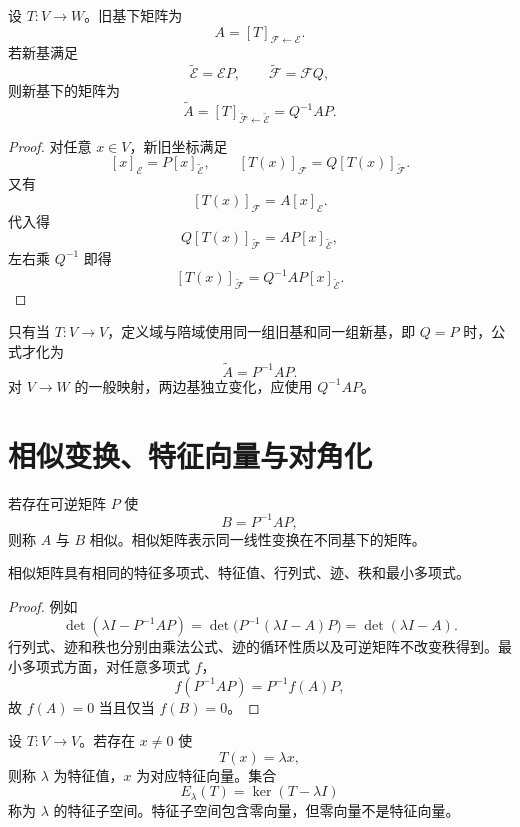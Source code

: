\begin{theorem}[一般线性映射的换基公式]
设 $T:V\to W$。旧基下矩阵为
\[
A=[T]_{\mathcal F\leftarrow\mathcal E}.
\]
若新基满足
\[
\widetilde{\mathcal E}=\mathcal E P,\qquad
\widetilde{\mathcal F}=\mathcal F Q,
\]
则新基下的矩阵为
\[
\widetilde A
=[T]_{\widetilde{\mathcal F}\leftarrow\widetilde{\mathcal E}}
=Q^{-1}AP.
\]
\end{theorem}
\begin{proof}
对任意 $x\in V$，新旧坐标满足
\[
[x]_{\mathcal E}=P[x]_{\widetilde{\mathcal E}},
\qquad
[T(x)]_{\mathcal F}=Q[T(x)]_{\widetilde{\mathcal F}}.
\]
又有
\[
[T(x)]_{\mathcal F}=A[x]_{\mathcal E}.
\]
代入得
\[
Q[T(x)]_{\widetilde{\mathcal F}}
=AP[x]_{\widetilde{\mathcal E}},
\]
左右乘 $Q^{-1}$ 即得
\[
[T(x)]_{\widetilde{\mathcal F}}
=Q^{-1}AP[x]_{\widetilde{\mathcal E}}.
\]
\end{proof}

\begin{pitfall}[一般换基公式不是总写成相似变换]
只有当 $T:V\to V$，定义域与陪域使用同一组旧基和同一组新基，即 $Q=P$ 时，公式才化为
\[
\widetilde A=P^{-1}AP.
\]
对 $V\to W$ 的一般映射，两边基独立变化，应使用 $Q^{-1}AP$。
\end{pitfall}

\section{相似变换、特征向量与对角化}

\begin{definition}[相似矩阵]
若存在可逆矩阵 $P$ 使
\[
B=P^{-1}AP,
\]
则称 $A$ 与 $B$ 相似。相似矩阵表示同一线性变换在不同基下的矩阵。
\end{definition}

\begin{proposition}[相似变换的不变量]
相似矩阵具有相同的特征多项式、特征值、行列式、迹、秩和最小多项式。
\end{proposition}
\begin{proof}
例如
\[
\det(\lambda I-P^{-1}AP)
=\det\bigl(P^{-1}(\lambda I-A)P\bigr)
=\det(\lambda I-A).
\]
行列式、迹和秩也分别由乘法公式、迹的循环性质以及可逆矩阵不改变秩得到。最小多项式方面，对任意多项式 $f$，
\[
f(P^{-1}AP)=P^{-1}f(A)P,
\]
故 $f(A)=0$ 当且仅当 $f(B)=0$。
\end{proof}

\begin{definition}
设 $T:V\to V$。若存在 $x\ne0$ 使
\[
T(x)=\lambda x,
\]
则称 $\lambda$ 为特征值，$x$ 为对应特征向量。集合
\[
E_\lambda(T)=\ker(T-\lambda I)
\]
称为 $\lambda$ 的特征子空间。特征子空间包含零向量，但零向量不是特征向量。
\end{definition}

